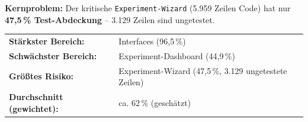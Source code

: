 


\begin{tcolorbox}[colback=red!5!white, colframe=red!75!black, title=Test-Abdeckung Frontend: Handlungsbedarf]
\textbf{Kernproblem:} Der kritische \texttt{Experiment-Wizard} (5.959 Zeilen Code) 
hat nur \textbf{47,5\,\% Test-Abdeckung} -- 3.129 Zeilen sind ungetestet.

\vspace{0.3cm}
\begin{tabular}{@{}ll@{}}
\textbf{Stärkster Bereich:} & Interfaces (96,5\,\%) \\
\textbf{Schwächster Bereich:} & Experiment-Dashboard (44,9\,\%) \\
\textbf{Größtes Risiko:} & Experiment-Wizard (47,5\,\%, 3.129 ungetestete Zeilen) \\
\textbf{Durchschnitt (gewichtet):} & ca. 62\,\% (geschätzt)
\end{tabular}
\end{tcolorbox}

\vspace{1cm}


